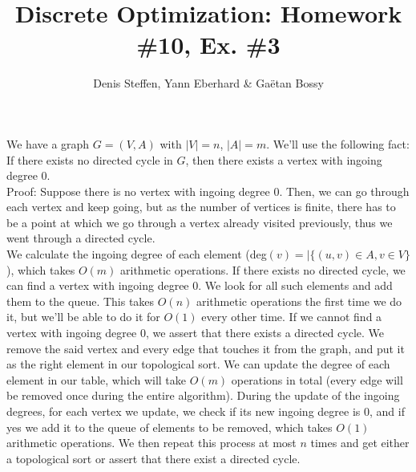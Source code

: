 \documentclass[a4paper,11pt,french]{article}
\title{Discrete Optimization: Homework \#10, Ex. \#3}
\author{Denis Steffen, Yann Eberhard \& Gaëtan Bossy}
\begin{document}
    
    \maketitle
We have a graph $G=(V,A)$ with $|V|=n$, $|A|=m$.
We'll use the following fact: If there exists no directed cycle in $G$, then there exists a vertex with ingoing degree 0. \\
Proof: Suppose there is no vertex with ingoing degree 0. Then, we can go through each vertex and keep going, but as the number of vertices is finite, there has to be a point at which we go through a vertex already visited previously, thus we went through a directed cycle. \\

We calculate the ingoing degree of each element (deg$(v)=|\{(u,v)\in A,v\in V\}$), which takes $O(m)$ arithmetic operations. If there exists no directed cycle, we can find a vertex with ingoing degree 0. We look for all such elements and add them to the queue. This takes $O(n)$ arithmetic operations the first time we do it, but we'll be able to do it for $O(1)$ every other time. If we cannot find a vertex with ingoing degree 0, we assert that there exists a directed cycle. We remove the said vertex and every edge that touches it from the graph, and put it as the right element in our topological sort. We can update the degree of each element in our table, which will take $O(m)$ operations in total (every edge will be removed once during the entire algorithm). During the update of the ingoing degrees, for each vertex we update, we check if its new ingoing degree is 0, and if yes we add it to the queue of elements to be removed, which takes $O(1)$ arithmetic operations. We then repeat this process at most $n$ times and get either a topological sort or assert that there exist a directed cycle.
\end{document}
